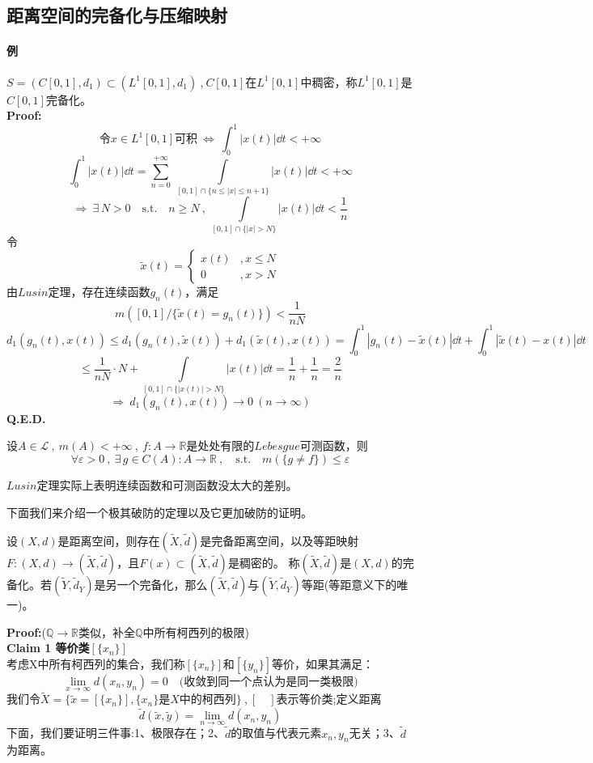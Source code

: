 \subsection{距离空间的完备化与压缩映射} \label{zip}
\paragraph*{例} \quad $S=(C[0,1],d_1) \subset (L^1[0,1],d_1) \ $,$ \ C[0,1]$在$L^1[0,1]$中稠密，称$L^1[0,1]$是$C[0,1]$完备化。\\
\textbf{Proof:}
\[\text{令}x \in L^1[0,1]\text{可积} \ \Leftrightarrow \ \int_0^1|x(t)|\dd t<+\infty\]
\[\int_0^1|x(t)|\dd t=\sum_{n=0}^{+\infty} \ \int\limits_{[0,1]\cap\{n \leq |x| \leq n+1\}}|x(t)|\dd t<+\infty \]
\[ \Rightarrow \ \exists \, N>0 \quad \text{s.t.} \quad n \geq N \ , \ \int\limits_{[0,1]\cap\{|x|>N\}}|x(t)|\dd t<\frac{1}{n}\]
令
\[\tilde{x}(t)=\left \{
\begin{array}{ll}
    x(t) & , x \leq N \\ 0 & , x>N
\end{array}    
\right .\]
由$Lusin$定理，存在连续函数$g_n(t)$，满足
\[m([0,1]/\{\tilde{x}(t)=g_n(t)\})<\frac{1}{nN}\]
\[d_1(g_n(t),x(t)) \leq d_1(g_n(t),\tilde{x}(t))+d_1(\tilde{x}(t),x(t))=\int_0^1|g_n(t)-\tilde{x}(t)|\dd t+\int_0^1|\tilde{x}(t)-x(t)|\dd t\]
\[\leq \frac{1}{nN} \cdot N+\int\limits_{[0,1]\cap\{|x(t)|>N\}}|x(t)|\dd t=\frac{1}{n}+\frac{1}{n}=\frac{2}{n}\]
\[\Rightarrow \ d_1(g_n(t),x(t)) \to 0 \ (n \to \infty)\]
\textbf{Q.E.D.}
\begin{theorem}[$Lusin$定理]
    设$A \in \mathscr{L} \ , \ m(A)<+\infty \ , \ f:A \to \mathbb{R}$是处处有限的$Lebesgue$可测函数，则
    \[\forall \varepsilon>0 \ , \ \exists \, g \in C(A):A\to \mathbb{R} \ , \quad \text{s.t.} \quad m(\{g \neq f\}) \leq \varepsilon\]
\end{theorem}
$Lusin$定理实际上表明连续函数和可测函数没太大的差别。

下面我们来介绍一个极其破防的定理以及它更加破防的证明。
\begin{theorem}[完备化定理]
    设$(X,d)$是距离空间，则存在$(\tilde{X},\tilde{d})$是完备距离空间，以及等距映射$F:(X,d) \rightarrow (\tilde{X},\tilde{d})$，且$F(x) \subset (\tilde{X},\tilde{d})$是稠密的。
    称$(\tilde{X},\tilde{d})$是$(X,d)$的完备化。若$(\tilde{Y},\tilde{d}_Y)$是另一个完备化，那么$(\tilde{X},\tilde{d})$与$(\tilde{Y},\tilde{d}_Y)$等距(等距意义下的唯一)。
\end{theorem}
\textbf{Proof:}($\mathbb{Q} \to \mathbb{R}$类似，补全$\mathbb{Q}$中所有柯西列的极限)\\
\textbf{Claim 1 等价类$[\{x_n\}]$}\\
考虑X中所有柯西列的集合，我们称$[\{x_n\}]$和$[\{y_n\}]$等价，如果其满足：
\[\lim_{x \to \infty}d(x_n,y_n)=0 \quad \text{(收敛到同一个点认为是同一类极限)}\]
我们令$\tilde{X}=\{\tilde{x}=[\{x_n\}],\{x_n\}\text{是}X\text{中的柯西列}\} \ $,$ \ [ \quad ]$表示等价类;定义距离
\[\tilde{d}(\tilde{x},\tilde{y})=\lim_{n \to \infty}d(x_n,y_n)\]
下面，我们要证明三件事:1、极限存在；2、$\tilde{d}$的取值与代表元素$x_n,y_n$无关；3、$\tilde{d}$为距离。

